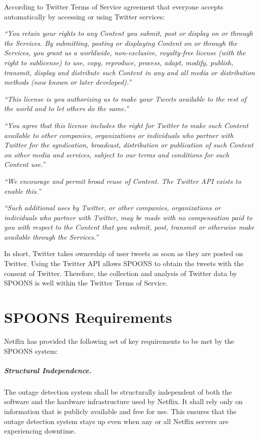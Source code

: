 \documentclass[12pt]{ucthesis}
\begin{document}
According to Twitter Terms of Service \cite{termsOfService} agreement that
everyone accepts automatically by accessing or using Twitter services:

\emph{``You retain your rights to any Content you submit, post or
display on or through the Services. By submitting, posting or displaying Content
on or through the Services, you grant us a worldwide, non-exclusive,
royalty-free license (with the right to sublicense) to use, copy, reproduce,
process, adapt, modify, publish, transmit, display and distribute such Content
in any and all media or distribution methods (now known or later developed).''}

\emph{``This license is you authorizing us to make your Tweets available to the
rest of the world and to let others do the same.''}

\emph{``You agree that this license includes the right for Twitter to make such
Content available to other companies, organizations or individuals who partner with
Twitter for the syndication, broadcast, distribution or publication of such
Content on other media and services, subject to our terms and conditions for
such Content use.''}

\emph{``We encourage and permit broad reuse of Content. The Twitter API exists to
enable this.''}

\emph{``Such additional uses by Twitter, or other companies, organizations or
individuals who partner with Twitter, may be made with no compensation paid to
you with respect to the Content that you submit, post, transmit or otherwise
make available through the Services.''}

In short, Twitter takes ownership of user tweets as soon as they are posted on Twitter.
Using the Twitter API allows SPOONS to obtain the tweets with the consent of Twitter.
Therefore, the collection and analysis of Twitter data by SPOONS is well within the
Twitter Terms of Service.

\chapter{SPOONS Requirements}
\label{requirements}
Netflix has provided the following set of key requirements to be met by the
SPOONS system:

\paragraph{Structural Independence.}
The outage detection system shall be structurally independent of both the
software and the hardware infrastructure used by Netflix. It shall rely only on
information that is publicly available and free for use. This ensures that the
outage detection system stays up even when any or all Netflix servers are
experiencing downtime.
\end{document}
